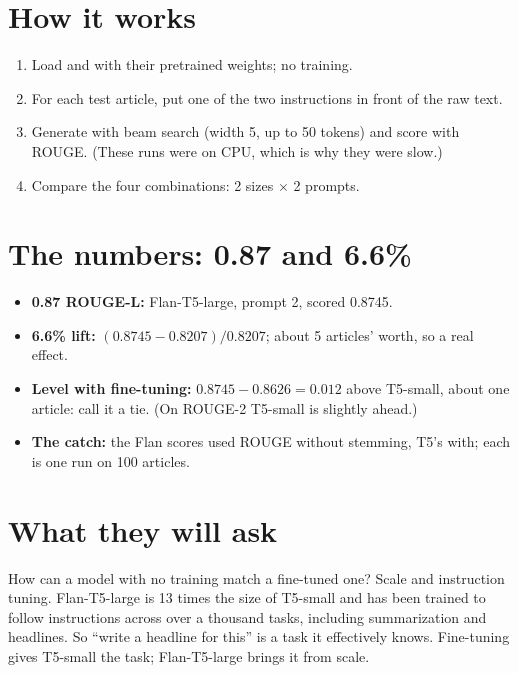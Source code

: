 \section{How it works}
\begin{enumerate}
  \item Load  and  with their pretrained weights; no training.
  \item For each test article, put one of the two instructions in front of the raw text.
  \item Generate with beam search (width 5, up to 50 tokens) and score with ROUGE. (These runs were on CPU, which is why they were slow.)
  \item Compare the four combinations: 2 sizes $\times$ 2 prompts.
\end{enumerate}

\section{The numbers: 0.87 and 6.6\%}

\begin{measured}
\begin{itemize}
  \item \textbf{0.87 ROUGE-L:} Flan-T5-large, prompt 2, scored 0.8745.
  \item \textbf{6.6\% lift:} $(0.8745 - 0.8207)/0.8207$; about 5 articles' worth, so a real effect.
  \item \textbf{Level with fine-tuning:} $0.8745 - 0.8626 = 0.012$ above T5-small, about one article: call it a tie. (On ROUGE-2 T5-small is slightly ahead.)
  \item \textbf{The catch:} the Flan scores used ROUGE without stemming, T5's with; each is one run on 100 articles.
\end{itemize}
\end{measured}

\section{What they will ask}

\begin{iq}[\core]{How can a model with no training match a fine-tuned one?}
Scale and instruction tuning. Flan-T5-large is 13 times the size of T5-small and has been trained to follow instructions across over a thousand tasks, including summarization and headlines. So ``write a headline for this'' is a task it effectively knows. Fine-tuning gives T5-small the task; Flan-T5-large brings it from scale.
\end{iq}


